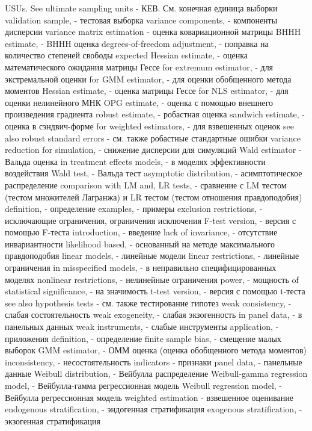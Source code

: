 USUs. See ultimate sampling units - КЕВ. См. конечная единица выборки
validation sample, - тестовая выборка
variance components, - компоненты дисперсии
variance matrix estimation - оценка ковариационной матрицы
BHHH estimate, - BHHH оценка
degrees-of-freedom adjustment, - поправка на количество степеней свободы
expected Hessian estimate, - оценка математического ожидания матрицы Гессе 
for extremum estimator, - для экстремальной оценки
for GMM estimator, - для оценки обобщенного метода моментов
Hessian estimate, - оценка матрицы Гессе
for NLS estimator, - для оценки нелинейного МНК
OPG estimate, - оценка с помощью внешнего произведения градиента
robust estimate, - робастная оценка
sandwich estimate, - оценка в сэндвич-форме
for weighted estimators, - для взвешенных оценок
see also robust standard errors - см. также робастные стандартные ошибки
variance reduction for simulation, - снижение дисперсии для симуляций
Wald estimator - Вальда оценка
in treatment effects models, - в моделях эффективности воздействия
Wald test, - Вальда тест
asymptotic distribution, - асимптотическое распределение
comparison with LM and, LR tests, - сравнение с LM тестом (тестом множителей Лагранжа) и LR тестом (тестом отношения правдоподобия)
definition, - определение
examples, - примеры
exclusion restrictions, - исключающие ограничения, ограничения исключения
F-test version, - версия с помощью F-теста
introduction, - введение
lack of invariance, - отсутствие инвариантности
likelihood based, - основанный на методе максимального правдоподобия
linear models, - линейные модели
linear restrictions, - линейные ограничения
in misspecified models, - в неправильно специфицированных моделях
nonlinear restrictions, - нелинейные ограничения
power, - мощность
of statistical significance, - на значимость
t-test version, - версия с помощью t-теста
see also hypothesis tests - см. также тестирование гипотез
weak consistency, - слабая состоятельность
weak exogeneity, - слабая экзогенность
in panel data, - в панельных данных
weak instruments, - слабые инструменты
application, - приложения
definition, - определение
finite sample bias, - смещение малых выборок 
GMM estimator, - ОММ оценка (оценка обобщенного метода моментов)
inconsistency, - несостоятельность
indicators - признаки
panel data, - панельные данные
Weibull distribution, - Вейбулла распределение
Weibull-gamma regression model, - Вейбулла-гамма регрессионная модель
Weibull regression model, - Вейбулла регрессионная модель
weighted estimation - взвешенное оценивание
endogenous stratification, - эндогенная стратификация
exogenous stratification, - экзогенная стратификация
